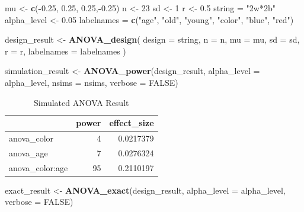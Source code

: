 \documentclass[]{book}
\newenvironment{Shaded}{\begin{snugshade}}{\end{snugshade}}
\newcommand{\DataTypeTok}[1]{\textcolor[rgb]{0.13,0.29,0.53}{#1}}
\newcommand{\DecValTok}[1]{\textcolor[rgb]{0.00,0.00,0.81}{#1}}
\newcommand{\FloatTok}[1]{\textcolor[rgb]{0.00,0.00,0.81}{#1}}
\newcommand{\KeywordTok}[1]{\textcolor[rgb]{0.13,0.29,0.53}{\textbf{#1}}}
\newcommand{\NormalTok}[1]{#1}
\newcommand{\OperatorTok}[1]{\textcolor[rgb]{0.81,0.36,0.00}{\textbf{#1}}}
\newcommand{\OtherTok}[1]{\textcolor[rgb]{0.56,0.35,0.01}{#1}}
\newcommand{\StringTok}[1]{\textcolor[rgb]{0.31,0.60,0.02}{#1}}
\begin{document}
\begin{Shaded}
\begin{Highlighting}[]
\NormalTok{mu <-}\StringTok{ }\KeywordTok{c}\NormalTok{(}\OperatorTok{-}\FloatTok{0.25}\NormalTok{, }\FloatTok{0.25}\NormalTok{, }\FloatTok{0.25}\NormalTok{,}\OperatorTok{-}\FloatTok{0.25}\NormalTok{)}
\NormalTok{n <-}\StringTok{ }\DecValTok{23}
\NormalTok{sd <-}\StringTok{ }\DecValTok{1}
\NormalTok{r <-}\StringTok{ }\FloatTok{0.5}
\NormalTok{string =}\StringTok{ "2w*2b"}
\NormalTok{alpha_level <-}\StringTok{ }\FloatTok{0.05}
\NormalTok{labelnames =}\StringTok{ }\KeywordTok{c}\NormalTok{(}\StringTok{"age"}\NormalTok{, }\StringTok{"old"}\NormalTok{, }\StringTok{"young"}\NormalTok{, }\StringTok{"color"}\NormalTok{, }\StringTok{"blue"}\NormalTok{, }\StringTok{"red"}\NormalTok{)}

\NormalTok{design_result <-}\StringTok{ }\KeywordTok{ANOVA_design}\NormalTok{(}
\DataTypeTok{design =}\NormalTok{ string,}
\DataTypeTok{n =}\NormalTok{ n,}
\DataTypeTok{mu =}\NormalTok{ mu,}
\DataTypeTok{sd =}\NormalTok{ sd,}
\DataTypeTok{r =}\NormalTok{ r,}
\DataTypeTok{labelnames =}\NormalTok{ labelnames}
\NormalTok{)}

\NormalTok{simulation_result <-}\StringTok{ }\KeywordTok{ANOVA_power}\NormalTok{(design_result, }
                                 \DataTypeTok{alpha_level =}\NormalTok{ alpha_level, }
                                 \DataTypeTok{nsims =}\NormalTok{ nsims,}
                                 \DataTypeTok{verbose =} \OtherTok{FALSE}\NormalTok{)}
\end{Highlighting}
\end{Shaded}

\begin{table}[t]

\caption{\label{tab:unnamed-chunk-98}Simulated ANOVA Result}
\centering
\begin{tabular}{l|r|r}
\hline
  & power & effect\_size\\
\hline
anova\_color & 4 & 0.0217379\\
\hline
anova\_age & 7 & 0.0276324\\
\hline
anova\_color:age & 95 & 0.2110197\\
\hline
\end{tabular}
\end{table}

\begin{Shaded}
\begin{Highlighting}[]
\NormalTok{exact_result <-}\StringTok{ }\KeywordTok{ANOVA_exact}\NormalTok{(design_result,}
                            \DataTypeTok{alpha_level =}\NormalTok{ alpha_level,}
                            \DataTypeTok{verbose =} \OtherTok{FALSE}\NormalTok{)}
\end{Highlighting}
\end{Shaded}
\end{document}
